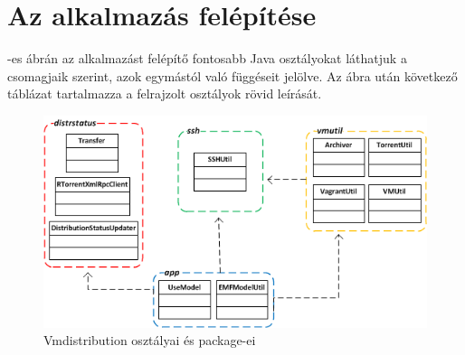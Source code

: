 \section{Az alkalmazás felépítése}
\label{impl_app}

-es ábrán az alkalmazást felépítő fontosabb Java osztályokat láthatjuk a csomagjaik szerint, azok egymástól való függéseit jelölve. Az ábra után következő táblázat tartalmazza a felrajzolt osztályok rövid leírását.

\begin{figure}[ht]
\centering
\includegraphics[width=150mm, keepaspectratio]{figures/packagediag.png}
\caption{Vmdistribution osztályai és package-ei}
\label{fig:packagediag}
\end{figure}


